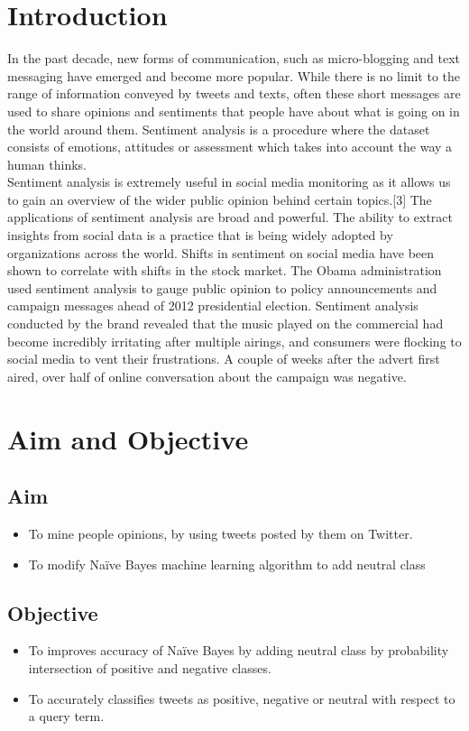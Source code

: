 \documentclass[a4paper,12pt]{report}
\begin{document}
	\section{Introduction}
In the past decade, new forms of communication, such as micro-blogging and text messaging have emerged and become more popular. While there is no limit to the range of information conveyed by tweets and texts, often these short messages are used to share opinions and sentiments that people have about what is going on in the world around them. Sentiment analysis is a procedure where the dataset consists of emotions, attitudes or assessment which takes into account the way a human thinks.\\
\hspace*{\parindent}Sentiment analysis is extremely useful in social media monitoring as it allows us to gain an overview of the wider public opinion behind certain topics.[3] The applications of sentiment analysis are broad and powerful. The ability to extract insights from social data is a practice that is being widely adopted by organizations across the world. Shifts in sentiment on social media have been shown to correlate with shifts in the stock market. The Obama administration used sentiment analysis to gauge public opinion to policy announcements and campaign messages ahead of 2012 presidential election. Sentiment analysis conducted by the brand revealed that the music played on the commercial had become incredibly irritating after multiple airings, and consumers were flocking to social media to vent their frustrations. A couple of weeks after the advert first aired, over half of online conversation about the campaign was negative.
		\section{Aim and Objective}
		\subsection{Aim}
		\begin{itemize}
			\item  To mine people opinions, by using tweets posted by them on Twitter.
			\item To modify Naïve Bayes machine learning algorithm to add neutral class
		\end{itemize}
		\subsection{Objective}
		\begin{itemize}
			\item  To improves accuracy of Naïve Bayes by adding neutral class by probability intersection of positive and negative classes.
			\item To accurately classifies tweets as positive, negative or neutral with respect to a query term.
		\end{itemize}
\end{document}
